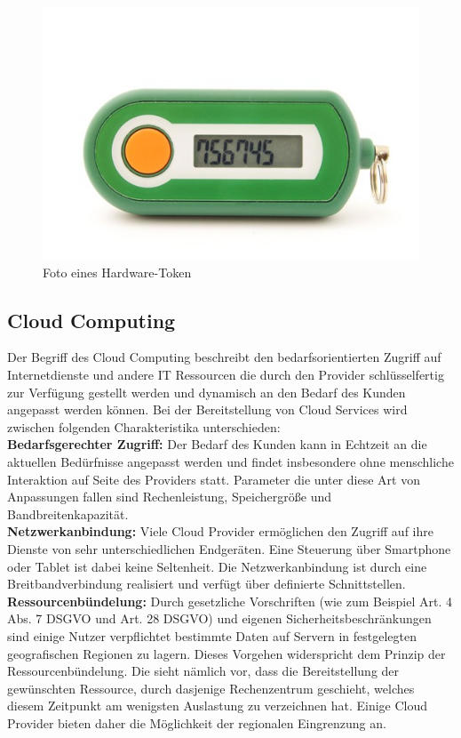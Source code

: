 \documentclass[
book,
a4paper,   
titlepage,  
halfparskip,
12pt        
]{scrartcl}
\begin{document}
\begin{onehalfspacing}
\begin{figure}[h]
	\centering
	\includegraphics[width=0.5\linewidth]{token.jpg}
	\caption[Token]{Foto eines Hardware-Token\cite{token}}
	\label{fig:token}
\end{figure}

\subsection{Cloud Computing}
\label{subsec:cloud}
Der Begriff des Cloud Computing beschreibt den bedarfsorientierten Zugriff auf Internetdienste und andere \ac{IT} Ressourcen die durch den Provider schlüsselfertig zur Verfügung gestellt werden und dynamisch an den Bedarf des Kunden angepasst werden können. Bei der Bereitstellung von Cloud Services wird zwischen folgenden Charakteristika unterschieden\cite[S. 8]{cloudsec}:\\
\textbf{Bedarfsgerechter Zugriff:} Der Bedarf des Kunden kann in Echtzeit an die aktuellen Bedürfnisse angepasst werden und findet insbesondere ohne menschliche Interaktion auf Seite des Providers statt. Parameter die unter diese Art von Anpassungen fallen sind Rechenleistung, Speichergröße und Bandbreitenkapazität.\cite[S. 8]{cloudsec}\\
\textbf{Netzwerkanbindung:}  Viele Cloud Provider ermöglichen den Zugriff auf ihre Dienste von sehr unterschiedlichen Endgeräten. Eine Steuerung über Smartphone oder Tablet ist dabei keine Seltenheit. Die Netzwerkanbindung ist durch eine Breitbandverbindung realisiert und verfügt über definierte Schnittstellen.\cite[S. 8]{cloudsec}\\
\textbf{Ressourcenbündelung:} Durch gesetzliche Vorschriften (wie zum Beispiel Art. 4 Abs. 7 DSGVO und Art. 28 DSGVO\cite{dsgvo}) und eigenen Sicherheitsbeschränkungen sind einige Nutzer verpflichtet bestimmte Daten auf Servern in festgelegten geografischen Regionen zu lagern. Dieses Vorgehen widerspricht dem Prinzip der Ressourcenbündelung. Die sieht nämlich vor, dass die Bereitstellung der gewünschten Ressource, durch dasjenige Rechenzentrum geschieht, welches diesem Zeitpunkt am wenigsten Auslastung zu verzeichnen hat. Einige Cloud Provider bieten daher die Möglichkeit der regionalen Eingrenzung an.\cite[S. 8]{cloudsec}\\

\end{onehalfspacing}
\end{document}
